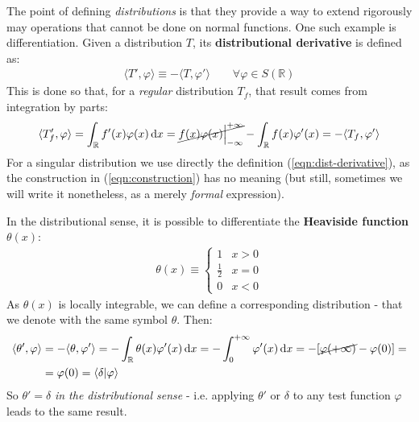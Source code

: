 \documentclass[../template.tex]{subfiles}
\begin{document}
The point of defining \textit{distributions} is that they provide a way to extend rigorously may operations that cannot be done on normal functions.  One such example is differentiation. Given a distribution $T$, its \textbf{distributional derivative} is defined as:
\begin{align} \label{eqn:dist-derivative}
    \langle T', \varphi \rangle \equiv - \langle T, \varphi' \rangle \qquad \forall \varphi \in S(\mathbb{R})
\end{align}  
This is done so that, for a \textit{regular} distribution $T_f$, that result comes from integration by parts:
\begin{align} \label{eqn:construction}
    \langle T'_f, \varphi \rangle = \int_{\mathbb{R}} f'(x) \varphi(x) \dd{x} = \cancel{f(x) \varphi(x) \Big|_{-\infty}^{+\infty}} - \int_{\mathbb{R}} f(x) \varphi'(x) = - \langle T_f, \varphi' \rangle
\end{align} 
For a singular distribution we use directly the definition (\ref{eqn:dist-derivative}), as the construction in (\ref{eqn:construction}) has no meaning (but still, sometimes we will write it nonetheless, as a merely \textit{formal} expression).

\medskip

In the distributional sense, it is possible to differentiate the \textbf{Heaviside function} $\theta(x)$:
\begin{align*}
    \theta(x) \equiv \begin{cases}
        1 & x > 0\\
        \frac{1}{2} & x=0\\
        0 & x < 0 
    \end{cases}
\end{align*}
As $\theta(x)$ is locally integrable, we can define a corresponding distribution - that we denote with the same symbol $\theta$. Then:
\begin{align*}
    \langle \theta', \varphi \rangle &= - \langle \theta, \varphi' \rangle = -\int_{\mathbb{R}} \theta(x) \varphi'(x) \dd{x} = -\int_0^{+\infty} \varphi'(x) \dd{x} = -[\cancel{\varphi(+\infty)}-\varphi(0)] =\\
    &= \varphi(0) = \langle \delta | \varphi \rangle
\end{align*}
So $\theta' = \delta$ \textit{in the distributional sense} - i.e. applying $\theta'$ or $\delta$ to any test function $\varphi$ leads to the same result.
\end{document}

